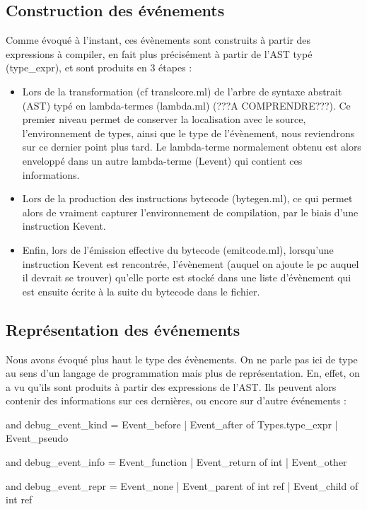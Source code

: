 \documentclass[11pt,a4paper]{report}
\begin{document}
\medskip

\subsection{Construction des événements}

Comme évoqué à l'instant, ces évènements sont construits à partir des expressions à compiler, en fait plus précisément à partir de l'AST typé (type\_expr), et sont produits en 3 étapes :

\medskip

\begin{itemize}

\item Lors de la transformation (cf translcore.ml) de l'arbre de syntaxe abstrait (AST) typé en lambda-termes (lambda.ml) (???A COMPRENDRE???). Ce premier niveau permet de conserver la localisation avec le source, l'environnement de types, ainsi que le type de l'évènement, nous reviendrons sur ce dernier point plus tard. Le lambda-terme normalement obtenu est alors enveloppé dans un autre lambda-terme (Levent) qui contient ces informations.

\item Lors de la production des instructions bytecode (bytegen.ml), ce qui permet alors de vraiment capturer l'environnement de compilation, par le biais d'une instruction Kevent.

\item Enfin, lors de l'émission effective du bytecode (emitcode.ml), lorsqu'une instruction Kevent est rencontrée, l'évènement (auquel on ajoute le pc auquel il devrait se trouver) qu'elle porte est stocké dans une liste d'évènement qui est ensuite écrite à la suite du bytecode dans le fichier.

\end{itemize}

\medskip

\subsection{Représentation des événements}

Nous avons évoqué plus haut le type des évènements. On ne parle pas ici de type au sens d'un langage de programmation mais plus de représentation. En, effet, on a vu qu'ils sont produits à partir des expressions de l'AST. Ils peuvent alors contenir des informations sur ces dernières, ou encore sur d'autre événements :

\begin{OCaml}

and debug_event_kind =
    Event_before
  | Event_after of Types.type_expr
  | Event_pseudo

and debug_event_info =
    Event_function
  | Event_return of int
  | Event_other

and debug_event_repr =
    Event_none
  | Event_parent of int ref
  | Event_child of int ref

\end{OCaml}
\end{document}
